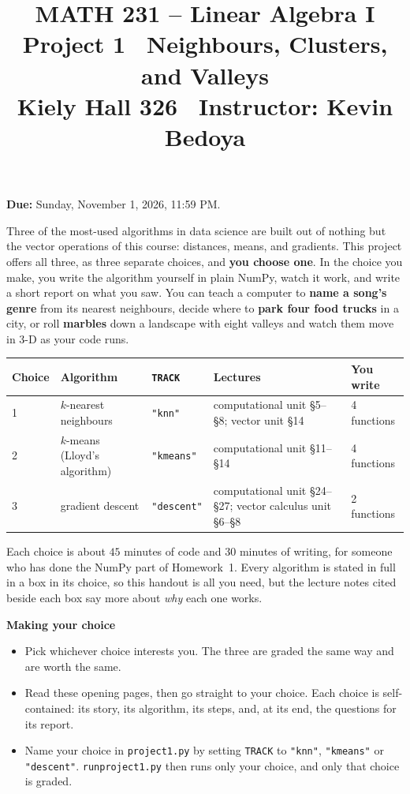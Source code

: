 \documentclass[11pt]{article}
\title{\vspace{-1.2cm}\textbf{\sffamily MATH 231 -- Linear Algebra I}\\[4pt]
       {\large\sffamily Project 1 \textbullet\ Neighbours, Clusters, and
        Valleys}\\[2pt]
       {\normalsize\sffamily Kiely Hall 326 \textbullet\
        Instructor: Kevin Bedoya}}
\author{}
\date{}
\theoremstyle{definition}
\newenvironment{callout}[1]
  {\par\medskip\needspace{5\baselineskip}%
   \begin{lrbox}{\qcbox}%
   \begin{minipage}{\dimexpr\textwidth-2\fboxsep-4pt}%
   \setlength{\parskip}{0.4em}%
   \textbf{\sffamily\color{RoyalBlue}#1}\par}
  {\end{minipage}\end{lrbox}%
   \begin{center}\colorbox{softbg}{\usebox{\qcbox}}\end{center}\medskip}
\newcommand{\file}[1]{\texttt{#1}}
\newcommand{\duedate}{Sunday, November 1, 2026, 11:59 PM}
\begin{document}
\maketitle
\vspace{-1.6cm}

\noindent\textbf{Due:} \duedate.

\medskip
\noindent Three of the most-used algorithms in data science are built out of
nothing but the vector operations of this course: distances, means, and
gradients. This project offers all three, as three separate choices, and
\textbf{you choose one}. In the choice you make, you write the algorithm
yourself in plain NumPy, watch it work, and write a short report on what you
saw. You can teach a computer to \textbf{name a song's genre} from its nearest
neighbours, decide where to \textbf{park four food trucks} in a city, or roll
\textbf{marbles} down a landscape with eight valleys and watch them move in 3-D
as your code runs.

\medskip
\begin{center}
\renewcommand{\arraystretch}{1.25}
\begin{tabular}{@{}l l l >{\raggedright\arraybackslash}p{4.6cm} l@{}}
\toprule
\textbf{Choice} & \textbf{Algorithm} & \textbf{\texttt{TRACK}} & \textbf{Lectures}
  & \textbf{You write} \\
\midrule
1 & $k$-nearest neighbours & \texttt{"knn"} & computational unit \S5--\S8;
  vector unit \S14 & 4 functions \\
2 & $k$-means (Lloyd's algorithm) & \texttt{"kmeans"} & computational unit
  \S11--\S14 & 4 functions \\
3 & gradient descent & \texttt{"descent"} & computational unit \S24--\S27;
  vector calculus unit \S6--\S8 & 2 functions \\
\bottomrule
\end{tabular}
\end{center}

\noindent Each choice is about $45$ minutes of code and $30$ minutes of writing,
for someone who has done the NumPy part of Homework~1. Every algorithm is
stated in full in a box in its choice, so this handout is all you need, but the
lecture notes cited beside each box say more about \emph{why} each one works.

\begin{callout}{Making your choice}
\begin{itemize}[leftmargin=1.4em,itemsep=5pt,topsep=3pt]
  \item Pick whichever choice interests you. The three are graded the same way
        and are worth the same.
  \item Read these opening pages, then go straight to your choice. Each choice
        is self-contained: its story, its algorithm, its steps, and, at its
        end, the questions for its report.
  \item Name your choice in \file{project1.py} by setting \texttt{TRACK} to
        \texttt{"knn"}, \texttt{"kmeans"} or \texttt{"descent"}. \file{runproject1.py}
        then runs only your choice, and only that choice is graded.
\end{itemize}
\end{callout}
\end{document}
